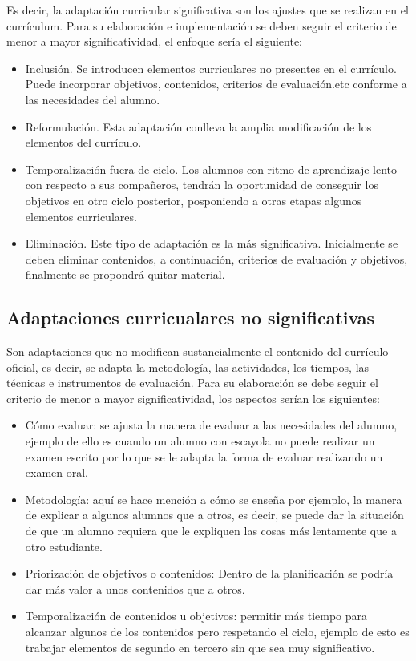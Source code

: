 Es decir, la adaptación curricular significativa son los ajustes que se realizan en el currículum. Para su elaboración e implementación se deben seguir el criterio de menor a mayor significatividad, el enfoque sería el siguiente:
\begin{itemize}
    \item Inclusión. Se introducen elementos curriculares no presentes en el currículo. Puede incorporar objetivos, contenidos, criterios de evaluación.etc conforme a las necesidades del alumno.
    \item Reformulación. Esta adaptación conlleva la amplia modificación de los elementos del currículo.
    \item Temporalización fuera de ciclo. Los alumnos con ritmo de aprendizaje lento con respecto a sus compañeros, tendrán la oportunidad de conseguir los objetivos en otro ciclo posterior, posponiendo a otras etapas algunos elementos curriculares.
    \item Eliminación. Este tipo de adaptación es la más significativa. Inicialmente se deben eliminar contenidos, a continuación, criterios de evaluación y objetivos, finalmente se propondrá quitar material.
\end{itemize}

\subsection{Adaptaciones curricualares no significativas}
Son adaptaciones que no modifican sustancialmente el contenido del currículo oficial, es decir, se adapta la metodología, las actividades, los tiempos, las técnicas e instrumentos de evaluación. Para su elaboración se debe  seguir el criterio de menor a mayor significatividad, los aspectos serían los siguientes:
\begin{itemize}
    \item Cómo evaluar: se ajusta la manera de evaluar a las necesidades del alumno, ejemplo de ello es cuando un alumno con escayola no puede realizar un examen escrito por lo que se le adapta la forma de evaluar realizando un examen oral.
    \item Metodología: aquí se hace mención a cómo se enseña por ejemplo, la manera de explicar a algunos alumnos que a otros, es decir, se puede dar la situación de que un alumno requiera que le expliquen las cosas más lentamente que a otro estudiante.
    \item Priorización de objetivos o contenidos: Dentro de la planificación se podría dar más valor a unos contenidos que a otros.
    \item Temporalización de contenidos u objetivos: permitir más tiempo para alcanzar algunos de los contenidos pero respetando el ciclo, ejemplo de esto es trabajar elementos de segundo en tercero sin que sea muy significativo.
\end{itemize}

